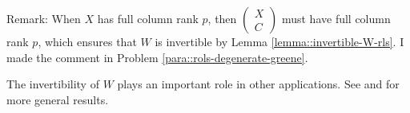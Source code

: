 Remark: When $X$ has full column rank $p$, then 
$
\begin{pmatrix}
X\\
C
\end{pmatrix}
$
must have full column rank $p$, which ensures that $W$ is invertible by Lemma \ref{lemma::invertible-W-rls}. I made the comment in Problem \ref{para::rols-degenerate-greene}. 

The invertibility of $W$ plays an important role in other applications. See \citet{benzi2005numerical} and \citet{bai2013nonsingularity} for more general results. 
 
 
